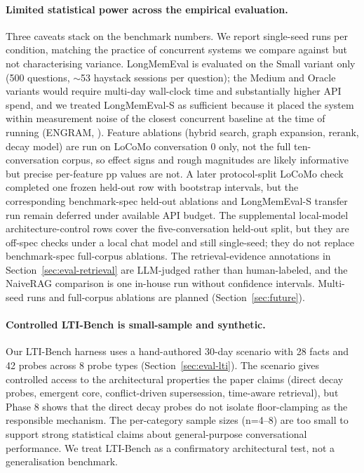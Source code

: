 \documentclass[11pt,a4paper]{article}
\begin{document}
\paragraph{Limited statistical power across the empirical evaluation.} Three caveats stack on the benchmark numbers. We report single-seed runs per condition, matching the practice of concurrent systems we compare against \citep{chhikara2024mem0, wei2026fademem, patel2025engram} but not characterising variance. LongMemEval is evaluated on the Small variant only (500 questions, $\sim$53 haystack sessions per question); the Medium and Oracle variants would require multi-day wall-clock time and substantially higher API spend, and we treated LongMemEval-S as sufficient because it placed the system within measurement noise of the closest concurrent baseline at the time of running (ENGRAM, \citealt{patel2025engram}). Feature ablations (hybrid search, graph expansion, rerank, decay model) are run on LoCoMo conversation 0 only, not the full ten-conversation corpus, so effect signs and rough magnitudes are likely informative but precise per-feature pp values are not. A later protocol-split LoCoMo check completed one frozen held-out row with bootstrap intervals, but the corresponding benchmark-spec held-out ablations and LongMemEval-S transfer run remain deferred under available API budget. The supplemental local-model architecture-control rows cover the five-conversation held-out split, but they are off-spec checks under a local chat model and still single-seed; they do not replace benchmark-spec full-corpus ablations. The retrieval-evidence annotations in Section~\ref{sec:eval-retrieval} are LLM-judged rather than human-labeled, and the NaiveRAG comparison is one in-house run without confidence intervals. Multi-seed runs and full-corpus ablations are planned (Section~\ref{sec:future}).

\paragraph{Controlled LTI-Bench is small-sample and synthetic.} Our LTI-Bench harness uses a hand-authored 30-day scenario with 28 facts and 42 probes across 8 probe types (Section~\ref{sec:eval-lti}). The scenario gives controlled access to the architectural properties the paper claims (direct decay probes, emergent core, conflict-driven supersession, time-aware retrieval), but Phase 8 shows that the direct decay probes do not isolate floor-clamping as the responsible mechanism. The per-category sample sizes (n=4--8) are too small to support strong statistical claims about general-purpose conversational performance. We treat LTI-Bench as a confirmatory architectural test, not a generalisation benchmark.
\end{document}
